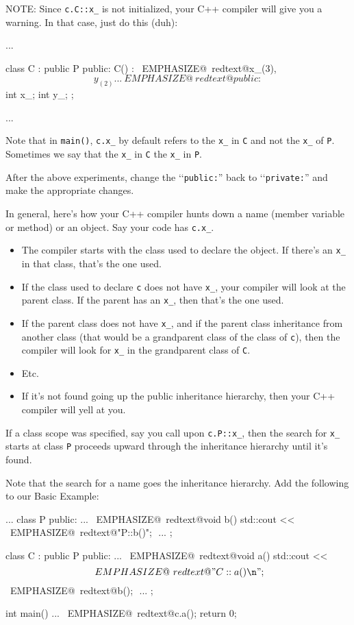 NOTE: Since \verb!c.C::x_! is not initialized, your C++ compiler will
give you a warning. In that case, just do this (duh):
\begin{console}
...

class C : public P
{
public:
        C() : ~EMPHASIZE@~redtext@x_(3),$$ y_(2) {}
        ...
~EMPHASIZE@~redtext@public:$$
        int x_;
        int y_;
};

... 
\end{console}

Note that in \verb!main()!, \verb!c.x_! by default refers to the \verb!x_! in \verb!C! and not the \verb!x_! of \verb!P!. Sometimes we say that the \verb!x_! in \verb!C!  the \verb!x_! in \verb!P!.

After the above experiments, change the \lq\lq \verb!public:!'' back to \lq\lq \verb!private:!'' and make the appropriate changes.

In general, here's how your C++ compiler hunts down a name (member variable or method) or an object. Say your code has \verb!c.x_!.

\begin{itemize}
\item
  The compiler starts with the class used to declare the object. If
  there's an \verb!x_! in that class, that's the one used.
\item
  If the class used to declare \verb!c! does not have \verb!x_!, your
  compiler will look at the parent class. If the parent has an
  \verb!x_!, then that's the one used.
\item
  If the parent class does not have \verb!x_!, and if the parent class
  inheritance from another class (that would be a grandparent class of
  the class of \verb!c!), then the compiler will look for \verb!x_! in
  the grandparent class of \verb!C!.
\item
  Etc.
\item
  If it's not found going up the public inheritance hierarchy, then your
  C++ compiler will yell at you.
\end{itemize}

If a class scope was specified, say you call upon \verb!c.P::x_!, then
the search for \verb!x_! starts at class \verb!P! proceeds upward
through the inheritance hierarchy until it's found.

Note that the search for a name goes  the inheritance
hierarchy. Add the following to our Basic Example:
\begin{console}[commandchars=\~\@\$]
...
class P
{
public:
        ...
        ~EMPHASIZE@~redtext@void b() { std::cout <<$$ 
                   ~EMPHASIZE@~redtext@"P::b()\n"; }$$
        ...
};

class C : public P
{
public:
        ...
        ~EMPHASIZE@~redtext@void a() { std::cout <<$$ 
                   ~EMPHASIZE@~redtext@"C::a()\n";$$
                   ~EMPHASIZE@~redtext@b();  }$$
        ...
};

int main()
{   
    ...
    ~EMPHASIZE@~redtext@c.a();$$
    return 0;
}
\end{console}

